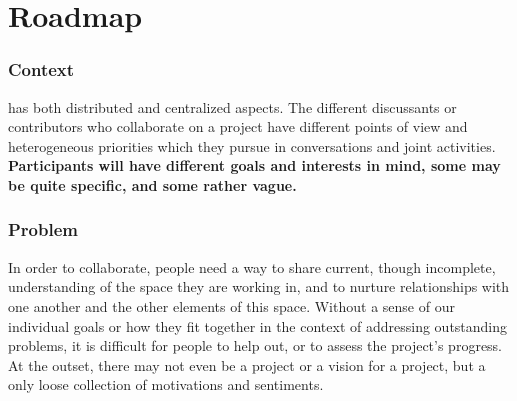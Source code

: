 \section{Roadmap} \label{sec:Roadmap}



\subsubsection*{Context}  has both distributed and centralized aspects. The different discussants or contributors who collaborate on a project have different points of view and heterogeneous priorities which they pursue in conversations and joint activities.
\textbf{Participants will have different goals and interests in mind, some may be quite specific, and some rather vague.}

\subsubsection*{Problem} In order to collaborate, people need a way to share current, though incomplete, understanding of the space they are working in, and to nurture relationships with one another and the other elements of this space.  Without a sense of our individual goals or how they fit together in the context of addressing outstanding problems, it is difficult for people to help out, or to assess the 
project's progress.  At the outset, there may not even be a project or a vision for a project, but a only loose collection of motivations and sentiments.   

